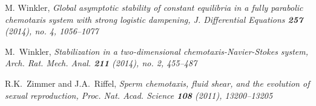 \documentclass[12pt,reqno]{amsart}
\begin{document}
\begin{thebibliography}{[MT]}


 M. Winkler, \it Global asymptotic stability of constant equilibria in a fully parabolic chemotaxis system with strong
logistic dampening, \rm J. Differential Equations {\bf 257} (2014), no. 4, 1056--1077


 M.~Winkler, \it Stabilization in a two-dimensional chemotaxis-Navier-Stokes system, \rm Arch. Rat. Mech. Anal.
{\bf 211} (2014), no. 2, 455--487

 R.K.~Zimmer and J.A.~Riffel, \it Sperm chemotaxis, fluid shear, and the evolution
of sexual reproduction, \rm Proc. Nat. Acad. Science {\bf 108} (2011), 13200--13205

\end{thebibliography}
\end{document}
